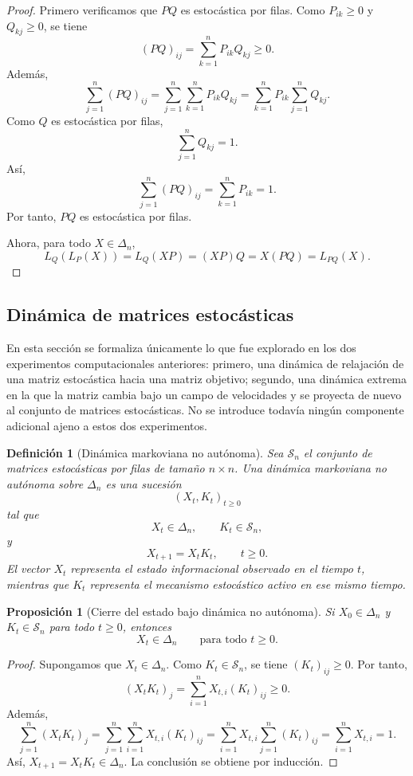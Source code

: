 \documentclass[12pt]{article}
\newtheorem{definicion}{Definición}[section]
\newtheorem{proposicion}{Proposición}[section]
\begin{document}
\begin{proof}
Primero verificamos que \(PQ\) es estocástica por filas. Como \(P_{ik}\geq0\) y
\(Q_{kj}\geq0\), se tiene
\[
(PQ)_{ij}=\sum_{k=1}^n P_{ik}Q_{kj}\geq 0.
\]
Además,
\[
\sum_{j=1}^n (PQ)_{ij}
=
\sum_{j=1}^n\sum_{k=1}^n P_{ik}Q_{kj}
=
\sum_{k=1}^n P_{ik}\sum_{j=1}^n Q_{kj}.
\]
Como \(Q\) es estocástica por filas,
\[
\sum_{j=1}^n Q_{kj}=1.
\]
Así,
\[
\sum_{j=1}^n (PQ)_{ij}
=
\sum_{k=1}^n P_{ik}
=
1.
\]
Por tanto, \(PQ\) es estocástica por filas.

Ahora, para todo \(X\in\Delta_n\),
\[
L_Q(L_P(X))
=
L_Q(XP)
=
(XP)Q
=
X(PQ)
=
L_{PQ}(X).
\]
\end{proof}


\subsection{Dinámica de matrices estocásticas}

En esta sección se formaliza únicamente lo que fue explorado en los dos
experimentos computacionales anteriores: primero, una dinámica de relajación de
una matriz estocástica hacia una matriz objetivo; segundo, una dinámica extrema
en la que la matriz cambia bajo un campo de velocidades y se proyecta de nuevo
al conjunto de matrices estocásticas. No se introduce todavía ningún componente adicional ajeno a estos dos
experimentos.

\begin{definicion}[Dinámica markoviana no autónoma]
Sea \(\mathcal S_n\) el conjunto de matrices estocásticas por filas de tamaño
\(n\times n\). Una dinámica markoviana no autónoma sobre \(\Delta_n\) es una
sucesión
\[
(X_t,K_t)_{t\geq 0}
\]
tal que
\[
X_t\in\Delta_n,
\qquad
K_t\in\mathcal S_n,
\]
y
\[
X_{t+1}=X_tK_t,
\qquad t\geq 0.
\]
El vector \(X_t\) representa el estado informacional observado en el tiempo
\(t\), mientras que \(K_t\) representa el mecanismo estocástico activo en ese
mismo tiempo.
\end{definicion}

\begin{proposicion}[Cierre del estado bajo dinámica no autónoma]
Si \(X_0\in\Delta_n\) y \(K_t\in\mathcal S_n\) para todo \(t\geq 0\), entonces
\[
X_t\in\Delta_n
\qquad
\text{para todo }t\geq 0.
\]
\end{proposicion}

\begin{proof}
Supongamos que \(X_t\in\Delta_n\). Como \(K_t\in\mathcal S_n\), se tiene
\((K_t)_{ij}\geq 0\). Por tanto,
\[
(X_tK_t)_j=\sum_{i=1}^n X_{t,i}(K_t)_{ij}\geq 0.
\]
Además,
\[
\sum_{j=1}^n (X_tK_t)_j
=
\sum_{j=1}^n\sum_{i=1}^n X_{t,i}(K_t)_{ij}
=
\sum_{i=1}^n X_{t,i}\sum_{j=1}^n (K_t)_{ij}
=
\sum_{i=1}^n X_{t,i}
=
1.
\]
Así, \(X_{t+1}=X_tK_t\in\Delta_n\). La conclusión se obtiene por inducción.
\end{proof}
\end{document}
